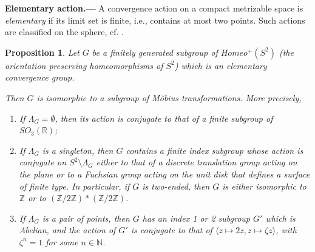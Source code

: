 \documentclass[11pt]{article}
\newtheorem{proposition}[theorem]{Proposition}
\theoremstyle{definition}
\newcommand\R{\mathbb{R}}
\newcommand\Z{\mathbb{Z}}
\begin{document}
{\noindent\bf Elementary action.---} A convergence action on a compact metrizable space is {\it elementary} if its limit set is finite, i.e.,
contains at most two points.  Such actions are classified on the sphere, cf. \cite[Theorem 3.4, Lemma 4.2]{martin:skora}.

\begin{proposition}\label{prop:elementary} Let $G$ be a finitely generated subgroup of $Homeo^+(S^2)$ (the orientation preserving homeomorphisms of $S^2$) which is an elementary convergence group. 

{Then $G$ is isomorphic} to a subgroup of M\"obius transformations.  More precisely,
\begin{enumerate}
\item If $\Lambda_G=\emptyset$, then its action is conjugate to that of a finite subgroup of $SO_3(\R)$;
\item If $\Lambda_G$ is a singleton, then $G$ contains a finite index subgroup whose action is conjugate {on $S^2\setminus\Lambda_G$} either to that of a discrete translation group acting on the plane or to a Fuchsian group {acting on the unit disk} that defines a surface of finite type. In particular, if $G$ is two-ended, then $G$ is either isomorphic to $\Z$ or to $(\Z/2\Z)*(\Z/2\Z)$.
\item If $\Lambda_G$ is a pair of points, then $G$ has an index 1 or 2 subgroup $G'$ which is Abelian, and the action of $G'$ is conjugate to that of $\langle z\mapsto 2z, z\mapsto \zeta z\rangle$, with $\zeta^n=1$ for some $n\in{\mathbb{N}}$.
\end{enumerate}
\end{proposition}
\end{document}
